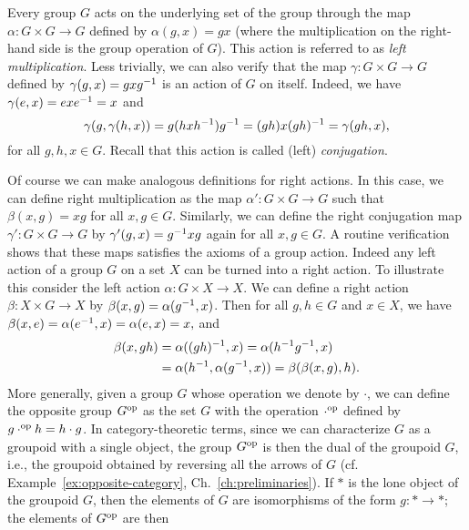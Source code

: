 \begin{example}
    Every group \(G\) acts on the underlying set of the group through the map
    \(\alpha: G \times G \to G\) defined by \(\alpha(g, x) = gx\) (where the
    multiplication on the right-hand side is the group operation of \(G\)). This
    action is referred to as \emph{left multiplication}. Less trivially, we can
    also verify that the map \(\gamma: G \times G \to G\) defined by \(
    \gamma(g, x) = gxg^{-1}\) is an action of \(G\) on itself. Indeed, we have
    \(\gamma(e, x) = exe^{-1} = x\) and
    \[
        \gamma(g, \gamma(h, x)) = g(hxh^{-1})g^{-1} = (gh)x(gh)^{-1} = \gamma(gh, x),
    \]
    for all \(g, h, x \in G\). Recall that this action is called (left)
    \emph{conjugation}.

    Of course we can make analogous definitions for right actions. In this case,
    we can define right multiplication as the map \(\alpha': G \times G \to G\)
    such that \(\beta(x, g) = xg\) for all \(x, g \in G\). Similarly, we can
    define the right conjugation map \(\gamma': G \times G \to G\) by
    \(\gamma'(g, x) = g^{-1} xg\) again for all \(x, g \in G\). A routine
    verification shows that these maps satisfies the axioms of a group action.
    Indeed any left action of a group \(G\) on a set \(X\) can be turned into a
    right action. To illustrate this consider the left action \(\alpha: G \times
    X \to X\). We can define a right action \(\beta: X \times G \to X\) by
    \(\beta(x, g) = \alpha(g^{-1}, x)\). Then for all \(g, h \in G\) and \(x \in
    X\), we have \(\beta(x, e) = \alpha(e^{-1}, x) = \alpha(e, x) = x,\) and
    \begin{align*}
        \beta(x, gh) &= \alpha((gh)^{-1}, x) = \alpha(h^{-1} g^{-1}, x) \\
        &= \alpha(h^{-1}, \alpha(g^{-1}, x)) = \beta(\beta(x, g), h).
    \end{align*}
    More generally, given a group \(G\) whose operation we denote by \(\cdot\),
    we can define the opposite group \(G^{\mathrm{op}}\) as the set \(G\) with the
    operation \(\cdot^{\mathrm{op}}\) defined by \(g \cdot^{\mathrm{op}} h = h \cdot g\). In
    category-theoretic terms, since we can characterize \(G\) as a groupoid with
    a single object, the group \(G^{\mathrm{op}}\) is then the dual of the groupoid \(G\),
    i.e., the groupoid obtained by reversing all the arrows of \(G\) (cf.
    Example~\ref{ex:opposite-category}, Ch.~\ref{ch:preliminaries}). If \(*\) is
    the lone object of the groupoid \(G\), then the elements of \(G\) are
    isomorphisms of the form \(g: * \to *\); the elements of \(G^{\mathrm{op}}\) are then

\end{example}
